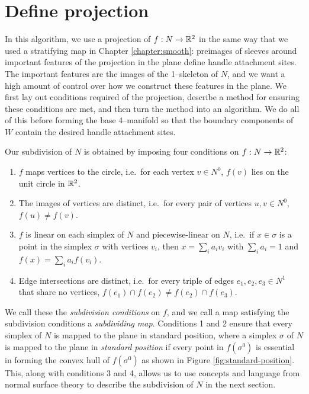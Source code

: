 \section{Define projection}
\label{section:pl-projection}

In this algorithm, we use a projection of $f:N\to\mathbb{R}^2$ in the same way that we used a stratifying map in Chapter \ref{chapter:smooth}: preimages of sleeves around important features of the projection in the plane define handle attachment sites.
The important features are the images of the 1--skeleton of $N$, and we want a high amount of control over how we construct these features in the plane.
We first lay out conditions required of the projection, describe a method for ensuring these conditions are met, and then turn the method into an algorithm.
We do all of this before forming the base 4--manifold so that the boundary components of $W$ contain the desired handle attachment sites.

Our subdivision of $N$ is obtained by imposing four conditions on $f:N\to\mathbb{R}^2$:
\begin{enumerate}
	\item $f$ maps vertices to the circle, i.e.\ for each vertex $v\in N^0$, $f(v)$ lies on the unit circle in $\mathbb{R}^2$.
	
	\item The images of vertices are distinct, i.e.\ for every pair of vertices $u,v\in N^0$, $f(u)\neq f(v)$.
	
	\item $f$ is linear on each simplex of $N$ and piecewise-linear on $N$, i.e.\ if $x\in\sigma$ is a point in the simplex $\sigma$ with vertices $v_i$, then $x=\sum_i a_i v_i$ with $\sum_i a_i = 1$ and $f(x) = \sum_i a_i f(v_i)$.
	
	\item Edge intersections are distinct, i.e.\ for every triple of edges $e_1, e_2, e_3\in N^1$ that share no vertices, $f(e_1)\cap f(e_2)\neq f(e_2)\cap f(e_3)$.
\end{enumerate}

We call these the \emph{subdivision conditions} on $f$, and we call a map satisfying the subdivision conditions a \emph{subdividing map}.
Conditions 1 and 2 ensure that every simplex of $N$ is mapped to the plane in standard position, where a simplex $\sigma$ of $N$ is mapped to the plane in \emph{standard position} if every point in $f(\sigma^0)$ is essential in forming the convex hull of $f(\sigma^0)$ as shown in Figure \ref{fig:standard-position}.
This, along with conditions 3 and 4, allows us to use concepts and language from normal surface theory to describe the subdivision of $N$ in the next section.

